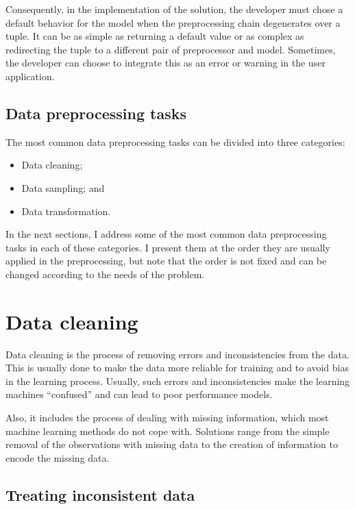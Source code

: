 Consequently, in the implementation of the solution, the developer must chose a default
behavior for the model when the preprocessing chain degenerates over a tuple.  It can
be as simple as returning a default value or as complex as redirecting the tuple to a
different pair of preprocessor and model.  Sometimes, the developer can choose to
integrate this as an error or warning in the user application.

\subsection{Data preprocessing tasks}

The most common data preprocessing tasks can be divided into three categories:
\begin{itemize}
  \itemsep0em
  \item Data cleaning;
  \item Data sampling; and
  \item Data transformation. %
\end{itemize}

In the next sections, I address some of the most common data preprocessing tasks
in each of these categories.  I present them at the order they are usually applied in the
preprocessing, but note that the order is not fixed and can be changed according to the
needs of the problem.

\section{Data cleaning}

Data cleaning is the process of removing errors and inconsistencies from the data.  This is
usually done to make the data more reliable for training and to avoid bias in the learning
process.  Usually, such errors and inconsistencies make the learning machines ``confused''
and can lead to poor performance models.

Also, it includes the process of dealing with missing information, which most machine
learning methods do not cope with.  Solutions range from the simple removal of the
observations with missing data to the creation of information to encode the missing data.

\subsection{Treating inconsistent data}


